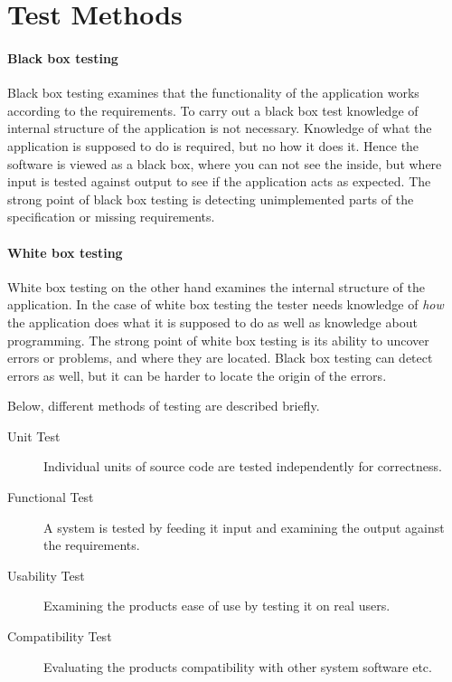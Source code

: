 \section{Test Methods}

\paragraph{Black box testing}

Black box testing examines that the functionality of the application works according to the requirements. To carry out a black box test knowledge of internal structure of the application is not necessary. Knowledge of what the application is supposed to do is required, but no how it does it. Hence the software is viewed as a black box, where you can not see the inside, but where input is tested against output to see if the application acts as expected. The strong point of black box testing is detecting unimplemented parts of the specification or missing requirements. \cite{whiteblacboxtesting}

\paragraph{White box testing}

White box testing on the other hand examines the internal structure of the application. In the case of white box testing the tester needs knowledge of \emph{how} the application does what it is supposed to do as well as knowledge about programming. The strong point of white box testing is its ability to uncover errors or problems, and where they are located. Black box testing can detect errors as well, but it can be harder to locate the origin of the errors. \cite{whiteblacboxtesting}

Below, different methods of testing are described briefly.

\begin{description}
  \item[Unit Test] Individual units of source code are tested independently for correctness. \cite{unitTesting}
  \item[Functional Test] A system is tested by feeding it input and examining the output against the requirements. \cite{functionalTesting}
  \item[Usability Test] Examining the products ease of use by testing it on real users. \cite{usabilityTesting}
  \item[Compatibility Test] Evaluating the products compatibility with other system software etc. \cite{compatibilityTesting}
\end{description}
